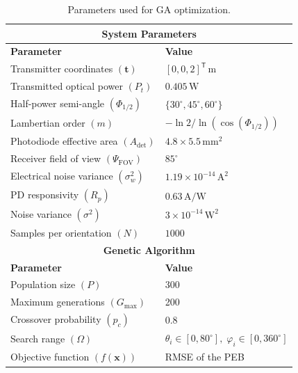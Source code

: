 \documentclass[journal]{IEEEtran}
\begin{document}
\begin{table}[tbh]
\centering
\caption{Parameters used for GA optimization.}
\label{tab:ga_params}
\begin{tabular}{|l|l|}
\hline
\multicolumn{2}{|c|}{\textbf{System Parameters}} \\ \hline
\textbf{Parameter}                  & \textbf{Value}                         \\ \hline
Transmitter coordinates $(\mathbf{t})$ & \([0,0,2]^{\mathsf T}\,\mathrm{m}\)              \\ \hline
Transmitted optical power $(P_t)$   & \(0.405\,\mathrm{W}\)            \\ \hline
Half-power semi-angle $(\Phi_{1/2})$ & \(\{30^\circ,45^\circ,60^\circ\}\)                \\ \hline
Lambertian order $(m)$              & \(-\ln2/\ln(\cos(\Phi_{1/2}))\)    \\ \hline
Photodiode effective area $(A_{\mathrm{det}})$        & \(4.8\times5.5\,\mathrm{mm}^2\) \\ \hline
Receiver field of view $(\Psi_{\mathrm{FOV}})$        & \(85^\circ\)       \\ \hline
Electrical noise variance $(\sigma_w^2)$ & \(1.19\times10^{-14}\,\mathrm{A}^2\) \\ \hline
PD responsivity $(R_{p})$ & \(0.63\,\mathrm{A/W}\)          \\ \hline
Noise variance $(\sigma^2)$         & \(3\times10^{-14}\,\mathrm{W}^2\) \\ \hline
Samples per orientation $(N)$       & \(1000\)                           \\ \hline
\multicolumn{2}{|c|}{\textbf{Genetic Algorithm}} \\ \hline
\textbf{Parameter}                  & \textbf{Value}                         \\ \hline
Population size $(P)$                    & 300                                    \\ \hline
Maximum generations $(G_{\mathrm{max}})$     & 200                                    \\ \hline
Crossover probability $(p_c)$       & 0.8                                    \\ \hline
Search range $(\Omega)$             & \(\theta_{i}\in[0,80^\circ],\;\varphi_{i}\in[0,360^\circ]\) \\ \hline
Objective function $(f(\mathbf x))$   & RMSE of the PEB                        \\ \hline

\end{tabular}
\end{table}
\end{document}

